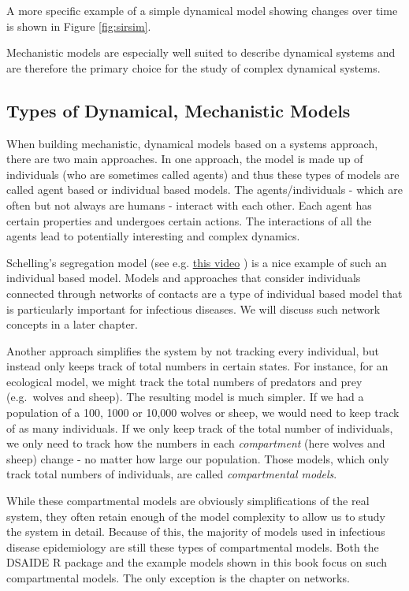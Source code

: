 \documentclass[]{book}
\theoremstyle{definition}
\theoremstyle{definition}
\theoremstyle{definition}
\theoremstyle{remark}
\begin{document}
A more specific example of a simple dynamical model showing changes over
time is shown in Figure \ref{fig:sirsim}.

Mechanistic models are especially well suited to describe dynamical
systems and are therefore the primary choice for the study of complex
dynamical systems.

\subsection{Types of Dynamical, Mechanistic
Models}\label{types-of-dynamical-mechanistic-models}

When building mechanistic, dynamical models based on a systems approach,
there are two main approaches. In one approach, the model is made up of
individuals (who are sometimes called agents) and thus these types of
models are called agent based or individual based models. The
agents/individuals - which are often but not always are humans -
interact with each other. Each agent has certain properties and
undergoes certain actions. The interactions of all the agents lead to
potentially interesting and complex dynamics.

Schelling's segregation model (see e.g.
\href{https://youtu.be/dFl3Cfw12bo}{this video} ) is a nice example of
such an individual based model. Models and approaches that consider
individuals connected through networks of contacts are a type of
individual based model that is particularly important for infectious
diseases. We will discuss such network concepts in a later chapter.

Another approach simplifies the system by not tracking every individual,
but instead only keeps track of total numbers in certain states. For
instance, for an ecological model, we might track the total numbers of
predators and prey (e.g.~wolves and sheep). The resulting model is much
simpler. If we had a population of a 100, 1000 or 10,000 wolves or
sheep, we would need to keep track of as many individuals. If we only
keep track of the total number of individuals, we only need to track how
the numbers in each \emph{compartment} (here wolves and sheep) change -
no matter how large our population. Those models, which only track total
numbers of individuals, are called \emph{compartmental models}.

While these compartmental models are obviously simplifications of the
real system, they often retain enough of the model complexity to allow
us to study the system in detail. Because of this, the majority of
models used in infectious disease epidemiology are still these types of
compartmental models. Both the DSAIDE R package and the example models
shown in this book focus on such compartmental models. The only
exception is the chapter on networks.
\end{document}
